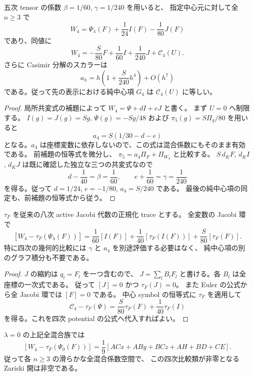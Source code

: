 \begin{theorem}
\label{thm:nfm-mixed-fourth-potential}
五次 tensor の係数 $\beta=1/60$, $\gamma=1/240$ を用いると、
指定中心元に対して全 $n\ge3$ で
\[
 \boxed{\quad W_4=\Psi_\lambda(F)+\frac1{24}I(F)-\frac1{80}J(F)\quad}
\]
であり、同値に
\[
 W_4=-\frac S{80}F+\frac1{60}I+\frac1{240}J+\mathcal C_4(U).
\]
さらに Casimir 分解のスカラーは
\[
 a_h=h\left(1+\frac{S}{240}h^4\right)+O(h^7)
\]
である。従って先の表示における純中心項 $G_4$ は
$\mathcal C_4(U)$ に等しい。
\end{theorem}

\begin{proof}
局所共変式の補題によって $W_4=\Psi+dI+eJ$ と書く。
まず $U=0$ へ制限する。
$I(g)=J(g)=Sg$, $\Psi(g)=-Sg/48$ および
$\pi_5(g)=S\Pi_g/80$ を用いると
\[
 a_4=S(1/30-d-e)
\]
となる。$a_4$ は座標変数に依存しないので、この式は混合係数にもそのまま有効である。
前補題の恒等式を微分し、
$\pi_5=a_4\Pi_F+\Pi_{W_4}$ と比較する。
$S\,d_KF$, $d_KI$, $d_KJ$ は既に確認した独立な三つの共変式なので
\[
 d-\frac1{40}=\beta=\frac1{60},\qquad
 e+\frac1{60}=\gamma=\frac1{240}
\]
を得る。従って $d=1/24$, $e=-1/80$, $a_4=S/240$ である。
最後の純中心項の同定も、前補題の恒等式から従う。
\end{proof}

\begin{corollary}[四次の幾何的比較類]
\label{cor:nfm-fourth-jacobi-class}
$\tau_F$ を従来の八次 active Jacobi 代数の正規化 trace とする。
全変数の Jacobi 環で
\[
 \boxed{\quad
 [W_4-\tau_F(\Psi_\lambda(F))]
 =\frac1{60}[I(F)]+\frac1{40}[\tau_F(I(F))]
             +\frac S{80}[\tau_F(F)] .\quad}
\]
特に四次の幾何的比較には $\gamma$ と $a_4$ を別途評価する必要はなく、
純中心項の別のグラフ積分も不要である。
\end{corollary}

\begin{proof}
$J$ の縮約は $q_l=F_l$ を一つ含むので、
$J=\sum_l B_l F_l$ と書ける。各 $B_l$ は全座標の一次式である。
従って $[J]=0$ かつ $\tau_F(J)=0$。
また Euler の公式から全 Jacobi 環では $[F]=0$ である。
中心 symbol の恒等式に $\tau_F$ を適用して
\[
 \mathcal C_4-\tau_F(\Psi)
       =\frac S{80}\tau_F(F)+\frac1{40}\tau_F(I)
\]
を得る。これを四次 potential の公式へ代入すればよい。
\end{proof}

\begin{proposition}
\label{prop:nfm-fourth-uniform-witness}
$\lambda=0$ の上記全混合族では
\[
 [W_4-\tau_F(\Psi_0(F))]
 =\frac19[ACx+ABy+BCz+AH+BD+CE].
\]
従って各 $n\ge3$ の滑らかな全混合係数空間で、
この四次比較類が非零となる Zariski 開は非空である。
\end{proposition}

